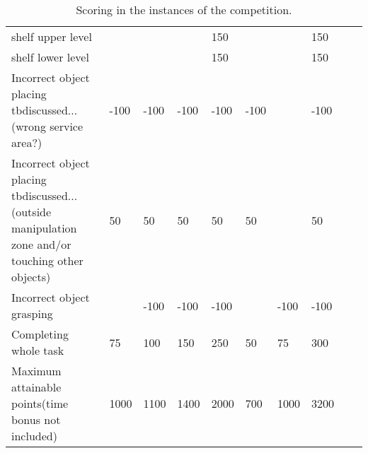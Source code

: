 \begin{landscape}
\begin{table}
\begin{tabular}{|p{5.5cm}*{9}{|P{1cm}}|}
	 \hspace{0.5cm} shelf upper level            &        &        &        &  150   &        &        &  150   \\
	 \hspace{0.5cm} shelf lower level            &        &        &        &  150   &        &        &  150   \\ \hline
   Incorrect object placing tbdiscussed... (wrong service area?)                   & -100   & -100   & -100   & -100   & -100   &        & -100   \\
	Incorrect object placing tbdiscussed... (outside manipulation zone and/or touching other objects)                    & 50   & 50   & 50   & 50   & 50   &        & 50   \\
   Incorrect object grasping                   &        & -100   & -100   & -100   &        & -100   & -100   \\
   Completing whole task                       &   75   &  100   &  150   &  250   &   50   &   75   &  300   \\ \hline\hline
   Maximum attainable points\newline (time bonus not included)
	                                             & 1000   & 1100   & 1400   &  2000  &  700   &  1000  &  3200  \\ \hline
 \end{tabular}
 \caption{Scoring in the instances of the \RCAW \YEAR competition.}
  \label{tab:InstancePoints}
\end{table}
\end{landscape}
